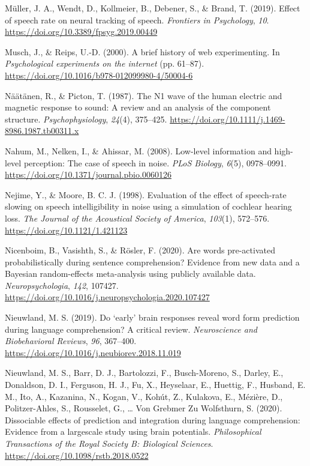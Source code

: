 \documentclass[a4paper, nobind]{templates/ociamthesis}
\newlength{\cslhangindent}
\newenvironment{CSLReferences}[2] %
 {%
  \setlength{\parindent}{0pt}
  \ifodd #1
  \let\oldpar\par
  \def\par{\hangindent=\cslhangindent\oldpar}
  \fi
  \setlength{\parskip}{1mm}
  \setlength{\baselineskip}{6mm}
 }%
 {}
\begin{document}
\begin{CSLReferences}{1}{0}
\leavevmode{}%
Müller, J. A., Wendt, D., Kollmeier, B., Debener, S., \& Brand, T. (2019). {Effect of speech rate on neural tracking of speech}. \emph{Frontiers in Psychology}, \emph{10}. \url{https://doi.org/10.3389/fpsyg.2019.00449}

\leavevmode{}%
Musch, J., \& Reips, U.-D. (2000). {A brief history of web experimenting}. In \emph{Psychological experiments on the internet} (pp. 61--87). \url{https://doi.org/10.1016/b978-012099980-4/50004-6}

\leavevmode{}%
Näätänen, R., \& Picton, T. (1987). {The N1 wave of the human electric and magnetic response to sound: A review and an analysis of the component structure}. \emph{Psychophysiology}, \emph{24}(4), 375--425. \url{https://doi.org/10.1111/j.1469-8986.1987.tb00311.x}

\leavevmode{}%
Nahum, M., Nelken, I., \& Ahissar, M. (2008). {Low-level information and high-level perception: The case of speech in noise}. \emph{PLoS Biology}, \emph{6}(5), 0978--0991. \url{https://doi.org/10.1371/journal.pbio.0060126}

\leavevmode{}%
Nejime, Y., \& Moore, B. C. J. (1998). {Evaluation of the effect of speech-rate slowing on speech intelligibility in noise using a simulation of cochlear hearing loss}. \emph{The Journal of the Acoustical Society of America}, \emph{103}(1), 572--576. \url{https://doi.org/10.1121/1.421123}

\leavevmode{}%
Nicenboim, B., Vasishth, S., \& Rösler, F. (2020). Are words pre-activated probabilistically during sentence comprehension? Evidence from new data and a Bayesian random-effects meta-analysis using publicly available data. \emph{Neuropsychologia}, \emph{142}, 107427. \url{https://doi.org/10.1016/j.neuropsychologia.2020.107427}

\leavevmode{}%
Nieuwland, M. S. (2019). {Do `early' brain responses reveal word form prediction during language comprehension? A critical review}. \emph{Neuroscience and Biobehavioral Reviews}, \emph{96}, 367--400. \url{https://doi.org/10.1016/j.neubiorev.2018.11.019}

\leavevmode{}%
Nieuwland, M. S., Barr, D. J., Bartolozzi, F., Busch-Moreno, S., Darley, E., Donaldson, D. I., Ferguson, H. J., Fu, X., Heyselaar, E., Huettig, F., Husband, E. M., Ito, A., Kazanina, N., Kogan, V., Kohút, Z., Kulakova, E., Mézière, D., Politzer-Ahles, S., Rousselet, G., \ldots{} Von Grebmer Zu Wolfsthurn, S. (2020). {Dissociable effects of prediction and integration during language comprehension: Evidence from a largescale study using brain potentials}. \emph{Philosophical Transactions of the Royal Society B: Biological Sciences}. \url{https://doi.org/10.1098/rstb.2018.0522}


\end{CSLReferences}
\end{document}
